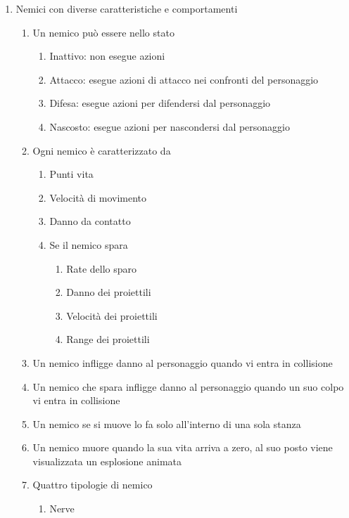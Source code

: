 \begin{enumerate}
    \item Nemici con diverse caratteristiche e comportamenti
    \begin{enumerate}
        \item Un nemico può essere nello stato
        \begin{enumerate}
            \item Inattivo: non esegue azioni
            \item Attacco: esegue azioni di attacco nei confronti del personaggio
            \item Difesa: esegue azioni per difendersi dal personaggio
            \item Nascosto: esegue azioni per nascondersi dal personaggio
        \end{enumerate}
        \item Ogni nemico è caratterizzato da
            \begin{enumerate}
                \item Punti vita
                \item Velocità di movimento
                \item Danno da contatto
                \item Se il nemico spara
                \begin{enumerate}
					\item Rate dello sparo
					\item Danno dei proiettili
					\item Velocità dei proiettili
					\item Range dei proiettili
                \end{enumerate}
            \end{enumerate}
        \item Un nemico infligge danno al personaggio quando vi entra in collisione
        \item Un nemico che spara infligge danno al personaggio quando un suo colpo vi entra in collisione
        \item Un nemico se si muove lo fa solo all'interno di una sola stanza
        \item Un nemico muore quando la sua vita arriva a zero, al suo posto viene visualizzata un esplosione animata
        \item Quattro tipologie di nemico
            \begin{enumerate}
                \item Nerve
                    \begin{enumerate}

\end{enumerate}
\end{enumerate}
\end{enumerate}
\end{enumerate}
